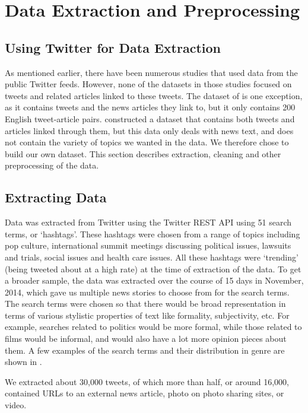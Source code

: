 \section{Data Extraction and Preprocessing}

\subsection{Using Twitter for Data Extraction}

As mentioned earlier, there have been numerous studies that used data from the public Twitter feeds. However, none of the datasets in those studies focused on tweets and related articles linked to these tweets. The dataset of  is one exception, as it contains tweets and the news articles they link to, but it only contains 200 English tweet-article pairs.  constructed a dataset that contains both tweets and articles linked through them, but this data only deals with news text, and does not contain the variety of topics we wanted in the data. We therefore chose to build our own dataset. This section describes extraction, cleaning and other preprocessing of the data.

\subsection{Extracting Data}

Data was extracted from Twitter using the Twitter REST API using 51 search terms, or ‘hashtags’. These hashtags were chosen from a range of topics including pop culture,  international summit meetings discussing political issues, lawsuits and trials, social issues and health care issues. All these hashtags were ‘trending’ (being tweeted about at a high rate) at the time of extraction of the data. To get a broader sample, the data was extracted over the course of 15 days in November, 2014, which gave us multiple news stories to choose from for the search terms. The search terms were chosen so that there would be broad representation in terms of various stylistic properties of text like formality, subjectivity, etc. For example, searches related to politics would be more formal, while those related to films would be informal, and would also have a lot more opinion pieces about them. A few examples of the search terms and their distribution in genre are shown in .

We extracted about 30,000 tweets, of which more than half, or around 16,000, contained URLs to an external news article, photo on photo sharing sites, or video. %

